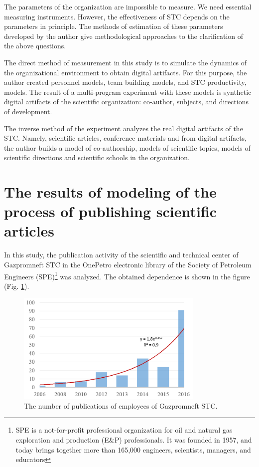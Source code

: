 \documentclass[12pt]{report}
\theoremstyle{definition}
\begin{document}
The parameters of the organization are impossible to measure. 
We need essential measuring instruments.
However, the effectiveness of STC depends on the parameters in principle. 
The methods of estimation of these parameters developed by the author give methodological approaches to the clarification of the above questions.

The direct method of measurement in this study is to simulate the dynamics of the organizational environment to obtain digital artifacts.
For this purpose, the author created personnel models, team building models, and STC productivity, models. 
The result of a multi-program experiment with these models is synthetic digital artifacts of the scientific organization: co-author, subjects, and directions of development. 

The inverse method of the experiment analyzes the real digital artifacts of the STC. 
Namely, scientific articles, conference materials and from digital artifacts, the author builds a model of co-authorship, models of scientific topics, models of scientific directions and scientific schools in the organization.

\section{The results of modeling of the process of publishing scientific articles}
\label{sec:di}
In this study, the publication activity of the scientific and technical center of Gazpromneft STC in the OnePetro electronic library of the  Society of Petroleum Engineers (SPE)\footnote{SPE is a not-for-profit professional organization  for oil and natural gas exploration and production (E\&P) professionals. It was founded in 1957, and today brings together more than 165,000 engineers, scientists, managers, and educators} was analyzed. 
The obtained dependence is shown in the figure (Fig. \ref{fig:om5}).

\begin{figure}[ht]
	\centering
	\includegraphics[width=0.8\textwidth]{om5}
	\caption{The number of publications of employees of Gazpromneft STC.}
	\label{fig:om5}
\end{figure}  
\end{document}

